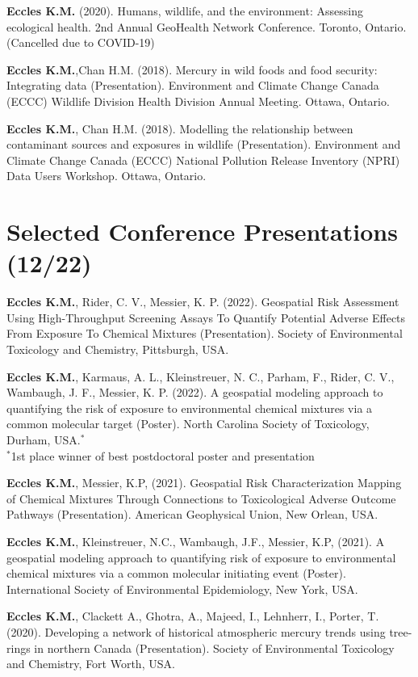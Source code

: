 \documentclass[margin,line]{res}
\begin{document}
\begin{resume}
\textbf{Eccles K.M. }(2020). Humans, wildlife, and the environment: Assessing ecological health. 2nd Annual GeoHealth Network Conference. Toronto, Ontario. (Cancelled due to COVID-19)

\textbf{Eccles K.M.},Chan H.M. (2018). Mercury in wild foods and food security: Integrating data (Presentation). Environment and Climate Change Canada (ECCC) Wildlife Division Health Division Annual Meeting. Ottawa, Ontario.

\textbf{Eccles K.M.}, Chan H.M. (2018). Modelling the relationship between contaminant sources and exposures in wildlife (Presentation). Environment and Climate Change Canada (ECCC) National Pollution Release Inventory (NPRI) Data Users Workshop. Ottawa, Ontario.

\vspace*{.1in}
\section{\sc Selected Conference Presentations (12/22)}

\textbf{Eccles K.M.}, Rider, C. V., Messier, K. P. (2022). Geospatial Risk Assessment Using High-Throughput Screening Assays To Quantify Potential Adverse Effects From Exposure To Chemical Mixtures (Presentation). Society of Environmental Toxicology and Chemistry, Pittsburgh, USA.

\textbf{Eccles K.M.}, Karmaus, A. L., Kleinstreuer, N. C., Parham, F., Rider, C. V., Wambaugh, J. F., Messier, K. P. (2022). A geospatial modeling approach to quantifying the risk of exposure to environmental chemical mixtures via a common molecular target (Poster). North Carolina Society of Toxicology, Durham, USA.$^{*}$\\
$^{*}$1st place winner of best postdoctoral poster and presentation

\textbf{Eccles K.M.}, Messier, K.P, (2021). Geospatial Risk Characterization Mapping of Chemical Mixtures Through Connections to Toxicological Adverse Outcome Pathways (Presentation). American Geophysical Union, New Orlean, USA.

\textbf{Eccles K.M.}, Kleinstreuer, N.C., Wambaugh, J.F., Messier, K.P, (2021). A geospatial modeling approach to quantifying risk of exposure to environmental chemical mixtures via a common molecular initiating event (Poster). International Society of Environmental Epidemiology, New York, USA.

\textbf{Eccles K.M.}, Clackett A., Ghotra, A., Majeed, I., Lehnherr, I., Porter, T. (2020). Developing a network of historical atmospheric mercury trends using tree-rings in northern Canada (Presentation).  Society of Environmental Toxicology and Chemistry, Fort Worth, USA.


\end{resume}
\end{document}

